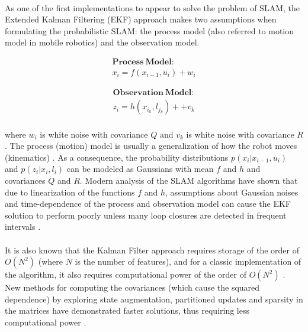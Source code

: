 \documentclass[11pt]{article}
\begin{document}
	\paragraph{}
	As one of the first implementations to appear to solve the problem of SLAM, the Extended Kalman Filtering (EKF) approach makes two assumptions when formulating the probabilistic SLAM: the process model (also referred to motion model in mobile robotics) and the observation model.
	
	\begin{minipage}{.5\linewidth}
		\centering
		\begin{equation*}
		\begin{split}
		\mathbf{Process\ Model:} \\ 
		x_i = f(x_{i-1}, u_i) + w_i
		\end{split}
		\end{equation*}
	\end{minipage}
	\begin{minipage}{.5\linewidth}
		\centering
		\begin{equation*}
		\begin{split}
		\mathbf{Observation\ Model:} \\ 
		z_i = h(x_{i_k}, l_{j_k})+ + v_k
		\end{split}
		\end{equation*}
	\end{minipage}

	\paragraph{}
	where $w_i$ is white noise with covariance $Q$ and $v_k$ is white noise with covariance $R$. The process (motion) model is usually a generalization of how the robot moves (kinematics) \cite{Montemerlo02fastslam:a}\cite{772544}. As a consequence, the probability distributions $p(x_i|x_{i-1}, u_i)$ and $p(z_i|x_i, l_i)$ can be modeled as Gaussians with mean $f$ and $h$ and covariances $Q$ and $R$. Modern analysis of the SLAM algorithms have shown that due to linearization of the functions $f$ and $h$, assumptions about Gaussian noises and time-dependence of the process and observation model can cause the EKF solution to perform poorly unless many loop closures are detected in frequent intervals \cite{doi:10.1177/1729881416669482}.


	\paragraph{}
	It is also known that the Kalman Filter approach requires storage of the order of $O(N^2)$ (where $N$ is the number of features), and for a classic implementation of the algorithm, it also requires computational power of the order of $O(N^2)$ \cite{CsorbaThesis}. New methods for computing the covariances (which cause the squared dependence) by exploring state augmentation, partitioned updates and sparsity in the matrices have demonstrated faster solutions, thus requiring less computational power \cite{SLAMPartII}.
\end{document}
